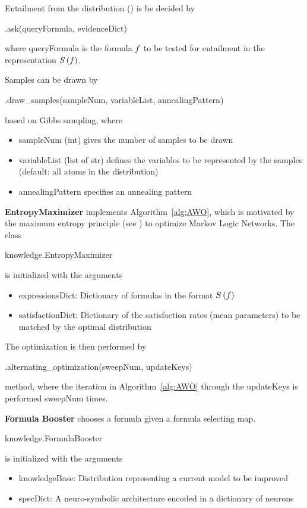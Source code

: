 Entailment from the distribution () is be decided by
\begin{centeredcode}
	.ask(queryFormula, evidenceDict)
\end{centeredcode}
where queryFormula is the formula $f$ to be tested for entailment in the representation $S\left(f\right)$.

Samples can be drawn by
\begin{centeredcode}
	.draw\_samples(sampleNum, variableList, annealingPattern)
\end{centeredcode}
based on Gibbs sampling, where
\begin{itemize}
	\item sampleNum (int) gives the number of samples to be drawn
	\item variableList (list of str) defines the variables to be represented by the samples (default: all atoms in the distribution)
	\item annealingPattern specifies an annealing pattern 
\end{itemize}



\textbf{EntropyMaximizer} implements Algorithm~\ref{alg:AWO}, which is motivated by the maximum entropy principle (see ) to optimize Markov Logic Networks.
The class  
\begin{centeredcode}
	knowledge.EntropyMaximizer
\end{centeredcode}
is initialized with the arguments
\begin{itemize}
	\item expressionsDict: Dictionary of formulas in the format $S\left(f\right)$ 
	\item satisfactionDict: Dictionary of the satisfaction rates (mean parameters) to be matched by the optimal distribution
\end{itemize}
The optimization is then performed by
\begin{centeredcode}
	.alternating\_optimization(sweepNum, updateKeys)
\end{centeredcode}
method, where the iteration in Algorithm~\ref{alg:AWO} through the updateKeys is performed sweepNum times.


\textbf{Formula Booster} chooses a formula given a formula selecting map.
\begin{centeredcode}
	knowledge.FormulaBooster
\end{centeredcode}
is initialized with the arguments
\begin{itemize}
	\item knowledgeBase: Distribution representing a current model to be improved
	\item specDict: A neuro-symbolic architecture encoded in a dictionary of neurons
\end{itemize}


